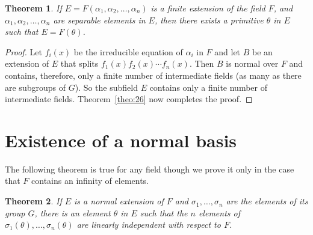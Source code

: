 \documentclass[10pt,leqno,a5paper]{book}
\newtheorem{theo}{Theorem}
\theoremstyle{definition}
\let\htw\section
\begin{document}
\begin{theo}
\label{theo:27}
If $E = F(\alpha_1, \alpha_2, \ldots, \alpha_n)$ is a finite extension of the field $F$, and $\alpha_1, \alpha_2, \ldots, \alpha_n$ are separable elements in $E$, then there exists a primitive $\theta$ in $E$ such that $E = F(\theta)$.
\end{theo}


\begin{proof}
Let $f_i(x)$ be the irreducible equation of $\alpha_i$ in $F$ and let $B$ be an extension of $E$ that splits $f_1(x) f_2(x) \cdots f_n(x)$.
Then $B$ is normal over $F$ and contains, therefore, only a finite number of intermediate fields (as many as there are subgroups of $G$).
So the subfield $E$ contains only a finite number of intermediate fields.
Theorem~\ref{theo:26} now completes the proof.
\end{proof}



\htw{Existence of a normal basis}

The following theorem is true for any field though we prove it only in the case that $F$ contains an infinity of elements.


\begin{theo}
\label{theo:28}
If $E$ is a normal extension of $F$ and $\sigma_1, \ldots, \sigma_n$ are the elements of its group $G$, there is an element $\theta$ in $E$ such that the $n$ elements of $\sigma_1(\theta), \ldots, \sigma_n(\theta)$ are linearly independent with respect to $F$.
\end{theo}
\end{document}
